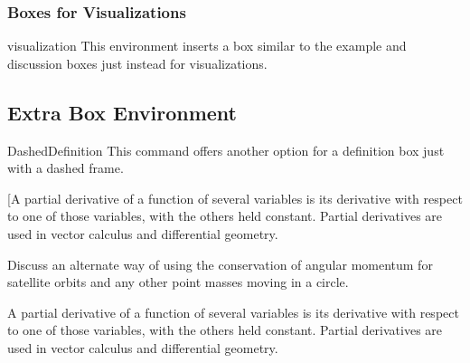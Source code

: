 \documentclass[12pt,hidelinks]{article}
\begin{document}
		\subsubsection{Boxes for Visualizations}
			\begin{docEnvironment}{visualization}{}
				This environment inserts a box similar to the example and discussion boxes just instead for visualizations. 
			\end{docEnvironment}
	\subsection{Extra Box Environment}
		\begin{docEnvironment}{DashedDefinition}{}
			This command offers another option for a definition box just with a dashed frame.
		\end{docEnvironment}
\vspace{2mm}		
\begin{disexam}
\begin{DashedDefinition}{}
[A partial derivative of a function of several variables is its derivative with respect to one of those variables, with the others held constant. Partial derivatives are used in vector calculus and differential geometry.
\end{DashedDefinition}
\end{disexam}
\vspace*{0.75\baselineskip}
\begin{disexam}
\vspace{1mm}
\begin{visualization}
Discuss an alternate way of using the conservation of angular momentum for satellite orbits and any other point masses moving in a circle.
\tcbline
\end{visualization}
\vspace{1mm}
\end{disexam}
\vspace*{0.75\baselineskip}
\begin{disexam}
\begin{example2}
\vspace{1mm}
A partial derivative of a function of several variables is its derivative with respect to one of those variables, with the others held constant. Partial derivatives are used in vector calculus and differential geometry.
\tcbline
\end{example2}
\end{disexam}
\end{document}
